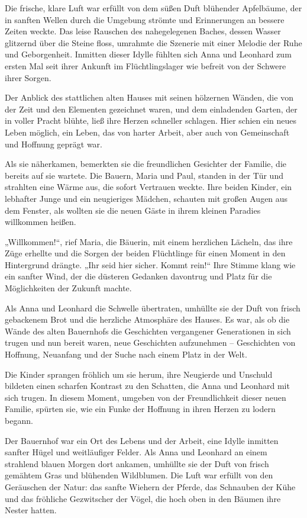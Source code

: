 \documentclass[
]{article}
\begin{document}
Die frische, klare Luft war erfüllt von dem süßen Duft blühender
Apfelbäume, der in sanften Wellen durch die Umgebung strömte und
Erinnerungen an bessere Zeiten weckte. Das leise Rauschen des
nahegelegenen Baches, dessen Wasser glitzernd über die Steine floss,
umrahmte die Szenerie mit einer Melodie der Ruhe und Geborgenheit.
Inmitten dieser Idylle fühlten sich Anna und Leonhard zum ersten Mal
seit ihrer Ankunft im Flüchtlingslager wie befreit von der Schwere ihrer
Sorgen.

Der Anblick des stattlichen alten Hauses mit seinen hölzernen Wänden,
die von der Zeit und den Elementen gezeichnet waren, und dem einladenden
Garten, der in voller Pracht blühte, ließ ihre Herzen schneller
schlagen. Hier schien ein neues Leben möglich, ein Leben, das von harter
Arbeit, aber auch von Gemeinschaft und Hoffnung geprägt war.

Als sie näherkamen, bemerkten sie die freundlichen Gesichter der
Familie, die bereits auf sie wartete. Die Bauern, Maria und Paul,
standen in der Tür und strahlten eine Wärme aus, die sofort Vertrauen
weckte. Ihre beiden Kinder, ein lebhafter Junge und ein neugieriges
Mädchen, schauten mit großen Augen aus dem Fenster, als wollten sie die
neuen Gäste in ihrem kleinen Paradies willkommen heißen.

„Willkommen!{\kern0pt}``, rief Maria, die Bäuerin, mit einem herzlichen
Lächeln, das ihre Züge erhellte und die Sorgen der beiden Flüchtlinge
für einen Moment in den Hintergrund drängte. „Ihr seid hier sicher.
Kommt rein!{\kern0pt}`` Ihre Stimme klang wie ein sanfter Wind, der die
düsteren Gedanken davontrug und Platz für die Möglichkeiten der Zukunft
machte.

Als Anna und Leonhard die Schwelle übertraten, umhüllte sie der Duft von
frisch gebackenem Brot und die herzliche Atmosphäre des Hauses. Es war,
als ob die Wände des alten Bauernhofs die Geschichten vergangener
Generationen in sich trugen und nun bereit waren, neue Geschichten
aufzunehmen -- Geschichten von Hoffnung, Neuanfang und der Suche nach
einem Platz in der Welt.

Die Kinder sprangen fröhlich um sie herum, ihre Neugierde und Unschuld
bildeten einen scharfen Kontrast zu den Schatten, die Anna und Leonhard
mit sich trugen. In diesem Moment, umgeben von der Freundlichkeit dieser
neuen Familie, spürten sie, wie ein Funke der Hoffnung in ihren Herzen
zu lodern begann.

Der Bauernhof war ein Ort des Lebens und der Arbeit, eine Idylle
inmitten sanfter Hügel und weitläufiger Felder. Als Anna und Leonhard an
einem strahlend blauen Morgen dort ankamen, umhüllte sie der Duft von
frisch gemähtem Gras und blühenden Wildblumen. Die Luft war erfüllt von
den Geräuschen der Natur: das sanfte Wiehern der Pferde, das Schnauben
der Kühe und das fröhliche Gezwitscher der Vögel, die hoch oben in den
Bäumen ihre Nester hatten.
\end{document}
